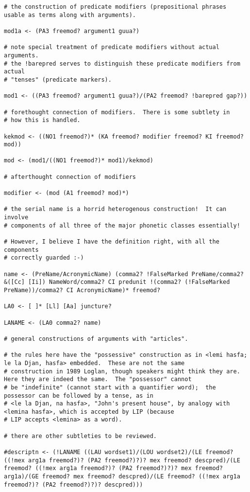 \documentclass[12pt]{book}
\begin{document}
{\begin{verbatim}
# the construction of predicate modifiers (prepositional phrases usable as terms along with arguments).

mod1a <- (PA3 freemod? argument1 guua?)

# note special treatment of predicate modifiers without actual arguments.
# the !barepred serves to distinguish these predicate modifiers from actual
# "tenses" (predicate markers).

mod1 <- ((PA3 freemod? argument1 guua?)/(PA2 freemod? !barepred gap?))

# forethought connection of modifiers.  There is some subtlety in
# how this is handled.

kekmod <- ((NO1 freemod?)* (KA freemod? modifier freemod? KI freemod? mod))

mod <- (mod1/((NO1 freemod?)* mod1)/kekmod)

# afterthought connection of modifiers

modifier <- (mod (A1 freemod? mod)*)

# the serial name is a horrid heterogenous construction!  It can involve
# components of all three of the major phonetic classes essentially!

# However, I believe I have the definition right, with all the components
# correctly guarded :-)

name <- (PreName/AcronymicName) (comma2? !FalseMarked PreName/comma2? &([Cc] [Ii]) NameWord/comma2? CI predunit !(comma2? (!FalseMarked PreName))/comma2? CI AcronymicName)* freemod? 

LA0 <- [ ]* [Ll] [Aa] juncture?  

LANAME <- (LA0 comma2? name)

# general constructions of arguments with "articles".

# the rules here have the "possessive" construction as in <lemi hasfa; le la Djan, hasfa> embedded.  These are not the same
# construction in 1989 Loglan, though speakers might think they are.  Here they are indeed the same.  The "possessor" cannot
# be "indefinite" (cannot start with a quantifier word);  the possessor can be followed by a tense, as in 
# <le la Djan, na hasfa>, "John's present house", by analogy with <lemina hasfa>, which is accepted by LIP (because
# LIP accepts <lemina> as a word).

# there are other subtleties to be reviewed.

#descriptn <- (!LANAME ((LAU wordset1)/(LOU wordset2)/(LE freemod? ((!mex arg1a freemod?)? (PA2 freemod?)?)? mex freemod? descpred)/(LE freemod? ((!mex arg1a freemod?)? (PA2 freemod?)?)? mex freemod? arg1a)/(GE freemod? mex freemod? descpred)/(LE freemod? ((!mex arg1a freemod?)? (PA2 freemod?)?)? descpred)))


\end{verbatim}}
\end{document}
